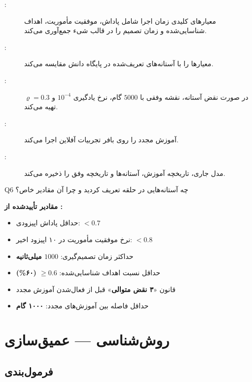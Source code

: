 \documentclass[oneside,openany,a4paper,12pt]{article}
\newcommand{\mapek}{\lr{MAPE-K}}
\begin{document}
\begin{hintbox}
\begin{description}
  \item[\textbf{}:] معیارهای کلیدی زمان اجرا شامل پاداش، موفقیت مأموریت، اهداف شناسایی‌شده و زمان تصمیم را در قالب شیء  جمع‌آوری می‌کند.
  \item[\textbf{}:] معیارها را با آستانه‌های تعریف‌شده در پایگاه دانش مقایسه می‌کند.
  \item[\textbf{}:] در صورت نقض آستانه، نقشه وفقی با $5000$ گام، نرخ یادگیری $10^{-4}$ و $\varrho=0.3$ تهیه می‌کند.
  \item[\textbf{}:] آموزش مجدد را روی بافر تجربیات آفلاین اجرا می‌کند.
  \item[\textbf{}:] مدل جاری، تاریخچه آموزش، آستانه‌ها و تاریخچه وفق را ذخیره می‌کند.
\end{description}
\end{hintbox}

\begin{questionbox}{Q6}
چه آستانه‌هایی در حلقه \mapek{} تعریف کردید و چرا آن مقادیر خاص؟
\end{questionbox}

\begin{hintbox}
\textbf{مقادیر تأییدشده از :}
\begin{itemize}
  \item حداقل پاداش اپیزودی: $< 0.7$
  \item نرخ موفقیت مأموریت در ۱۰ اپیزود اخیر: $< 0.8$
  \item حداکثر زمان تصمیم‌گیری: \textbf{$1000$ میلی‌ثانیه}
  \item حداقل نسبت اهداف شناسایی‌شده: \textbf{$\geq 0.6$ (۶۰\%)}
  \item قانون «\textbf{۳ نقض متوالی}» قبل از فعال‌شدن آموزش مجدد
  \item حداقل فاصله بین آموزش‌های مجدد: \textbf{۱۰۰۰ گام}
\end{itemize}
\end{hintbox}

\section{روش‌شناسی — عمیق‌سازی}

\subsection{فرمول‌بندی }
\end{document}
